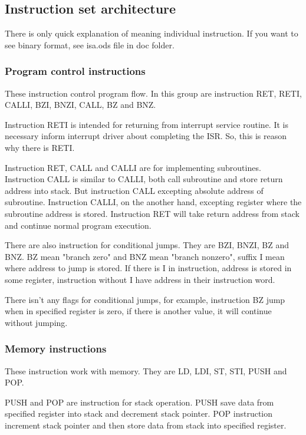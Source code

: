 \subsection{Instruction set architecture}

There is only quick explanation of meaning individual instruction. If you want
to see binary format, see isa.ods file in doc folder.

\subsubsection{Program control instructions}

These instruction control program flow. In this group are instruction RET,
RETI, CALLI, BZI, BNZI, CALL, BZ and BNZ.

Instruction RETI is intended for returning from interrupt service routine. It
is necessary inform interrupt driver about completing the ISR. So, this is
reason why there is RETI.

Instruction RET, CALL and CALLI are for implementing subroutines. Instruction
CALL is similar to CALLI, both call subroutine and store return address into
stack. But instruction CALL excepting absolute address of subroutine.
Instruction CALLI, on the another hand, excepting register where the subroutine
address is stored. Instruction RET will take return address from stack and
continue normal program execution.

There are also instruction for conditional jumps. They are BZI, BNZI, BZ and
BNZ. BZ mean "branch zero" and BNZ mean "branch nonzero", suffix I mean where
address to jump is stored. If there is I in instruction, address is stored in
some register, instruction without I have address in their instruction word.

There isn't any flags for conditional jumps, for example, instruction BZ jump
when in specified register is zero, if there is another value, it will continue
without jumping.

\subsubsection{Memory instructions}

These instruction work with memory. They are LD, LDI, ST, STI, PUSH and POP.

PUSH and POP are instruction for stack operation. PUSH save data from specified
register into stack and decrement stack pointer. POP instruction increment
stack pointer and then store data from stack into specified register.

